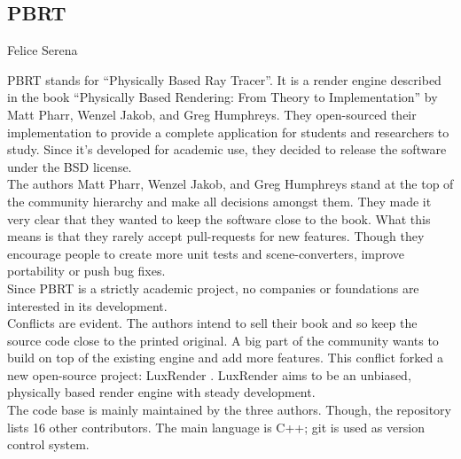 \subsection{PBRT}{Felice Serena}

PBRT stands for ``Physically Based Ray Tracer''. 
It is a render engine described in the book ``Physically Based Rendering: 
From Theory to Implementation'' by Matt Pharr, Wenzel Jakob, and Greg Humphreys. 
They open-sourced their implementation to provide a complete application for students and researchers to study. 
Since it's developed for academic use, they decided to release the software under the BSD license. 
\\

The authors Matt Pharr, Wenzel Jakob, and Greg Humphreys stand at the top of the community hierarchy and make all decisions amongst them. 
They made it very clear that they wanted to keep the software close to the book. 
What this means is that they rarely accept pull-requests for new features. 
Though they encourage people to create more unit tests and scene-converters, improve portability or push bug fixes. \cite{pbrt-pull-requests} \\

Since PBRT is a strictly academic project, no companies or foundations are interested in its development. 
\\

Conflicts are evident. 
The authors intend to sell their book and so keep the source code close to the printed original. 
A big part of the community wants to build on top of the existing engine and add more features. 
This conflict forked a new open-source project: LuxRender \cite{luxrender-home}.
LuxRender aims to be an unbiased, physically based render engine with steady development.
\\

The code base is mainly maintained by the three authors.
Though, the repository lists 16 other contributors.
The main language is C++; git is used as version control system.

